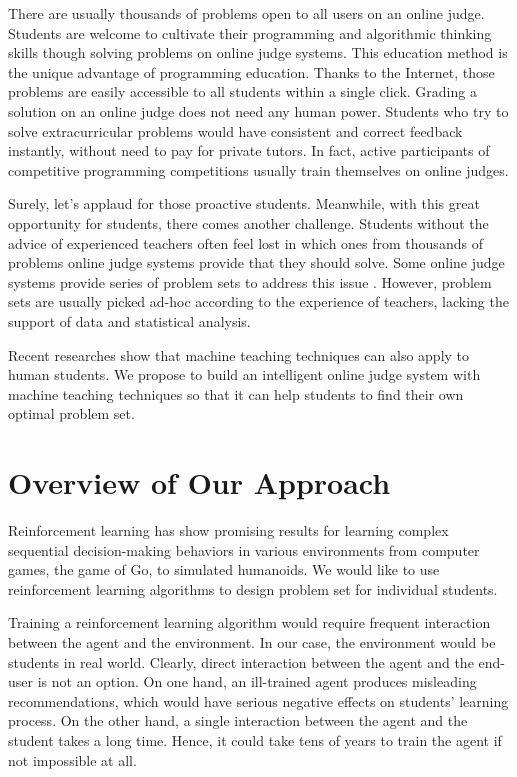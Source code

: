     There are usually thousands of problems open to all users on an online judge.
    Students are welcome to cultivate their programming and algorithmic thinking skills
    though solving problems on online judge systems.
    This education method is the unique advantage of programming education.
    Thanks to the Internet, those problems are easily accessible to all students within a single click.
    Grading a solution on an online judge does not need any human power.
    Students who try to solve extracurricular problems
    would have consistent and correct feedback instantly, without need to pay for private tutors.
    In fact, active participants of competitive programming competitions usually train themselves on online judges.

    Surely, let's applaud for those proactive students.
    Meanwhile, with this great opportunity for students, there comes another challenge.
    Students without the advice of experienced teachers often feel lost in 
    which ones from thousands of problems online judge systems provide that they should solve.
    Some online judge systems provide series of problem sets to address this issue \cite{bez2014uri}.
    However, problem sets are usually picked ad-hoc according to the experience of teachers,
    lacking the support of data and statistical analysis.

    Recent researches \cite{Zhu2015,Zhu2018} show that
    machine teaching techniques can also apply to human students.
    We propose to build an intelligent online judge system with machine teaching techniques
    so that it can help students to find their own optimal problem set.

\section{Overview of Our Approach}

    Reinforcement learning has show promising results for
    learning complex sequential decision-making behaviors in various environments
    from computer games, the game of Go, to simulated humanoids.
    We would like to use reinforcement learning algorithms to design problem set for individual students.

    Training a reinforcement learning algorithm would require
    frequent interaction between the agent and the environment.
    In our case, the environment would be students in real world.
    Clearly, direct interaction between the agent and the end-user is not an option.
    On one hand, an ill-trained agent produces misleading recommendations,
    which would have serious negative effects on students' learning process.
    On the other hand, a single interaction between the agent and the student takes a long time.
    Hence, it could take tens of years to train the agent if not impossible at all.

